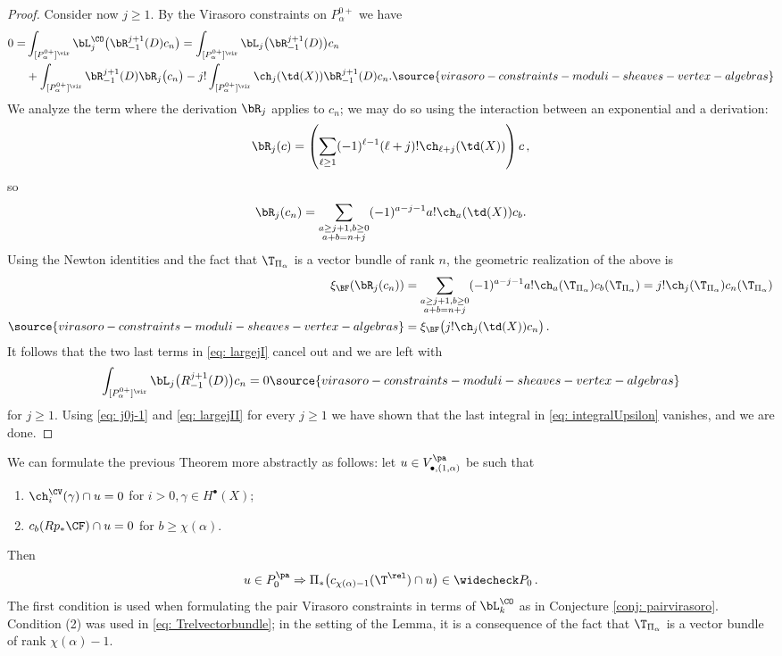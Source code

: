 \begin{proof}
Consider now $j\geq 1$. By the Virasoro constraints on $P^{0+}_\alpha$ we have
\begin{align}\nonumber 0=&\int_{[P_\alpha^{0+}]^\vir}\bL_j^{\CO}\big(\bR_{-1}^{j+1}(D)c_{n}\big)=\int_{[P_\alpha^{0+}]^\vir}\bL_j\big(\bR_{-1}^{j+1}(D)\big)c_{n}\\
&+\int_{[P_\alpha^{0+}]^\vir}\bR_{-1}^{j+1}(D)\bR_j\big(c_{n}\big)-j!\int_{[P_\alpha^{0+}]^\vir} \ch_j(\td(X))\bR_{-1}^{j+1}(D)c_{n}. \label{eq: largejI}
\source{virasoro-constraints-moduli-sheaves-vertex-algebras}
\end{align}
We analyze the term where the derivation $\bR_j$ applies to $c_{n}$; we may do so using the interaction between an exponential and a derivation:
\[\bR_j(c)=\left(\sum_{\ell \geq 1}(-1)^{\ell-1} (\ell+j)! \ch_{\ell+j}(\td(X))\right)c\,,\]
so
\[\bR_j(c_{n})=\sum_{\substack{a\geq j+1, b\geq 0\\
a+b=n+j}} (-1)^{a-j-1} a!\ch_{a}(\td(X))c_{b}.\]
Using the Newton identities and the fact that $\T_{\Pi_\alpha}$ is a vector bundle of rank $n$, the geometric realization of the above is
\begin{align}\nonumber \label{eq: Trelvectorbundle}\xi_\BF(\bR_j(c_{n}))&=\sum_{\substack{a\geq j+1, b\geq 0\\a+b=n+j}} (-1)^{a-j-1} a!\ch_{a}(\T_{\Pi_\alpha})c_{b}(\T_{\Pi_\alpha})=j!\ch_{j}(\T_{\Pi_\alpha})c_{n}(\T_{\Pi_\alpha})\\
\source{virasoro-constraints-moduli-sheaves-vertex-algebras}
&=\xi_\BF\big(j! \ch_j(\td(X))c_n\big)\,.
\end{align}
It follows that the two last terms in \eqref{eq: largejI} cancel out and we are left with
\begin{equation}
\label{eq: largejII} \int_{[P_\alpha^{0+}]^\vir}\bL_j\big(R_{-1}^{j+1}(D)\big)c_{n}=0
\source{virasoro-constraints-moduli-sheaves-vertex-algebras}
\end{equation}
for $j\geq 1$. Using \eqref{eq: j0j-1} and \eqref{eq: largejII} for every $j\geq 1$ we have shown that the last integral in \eqref{eq: integralUpsilon} vanishes, and we are done. \qedhere
\end{proof}

\begin{remark}
\notready\label{rem: abstractprojective}
We can formulate the previous Theorem more abstractly as follows: let $u\in V_{\bullet, (1, \alpha)}^{\pa}$ be such that
\begin{enumerate}
\item $\ch_i^\CV(\gamma)\cap u=0$ for $i>0, \gamma\in H^\bullet(X)$;
\item $c_{b}(Rp_\ast \CF)\cap u=0$ for $b\geq \chi(\alpha)$.
\end{enumerate}
Then
\[u\in P_0^{\pa}\Rightarrow \Pi_\ast\big(c_{\chi(\alpha)-1}(\T^{\rel})\cap u\big)\in \widecheck P_0\,.\]
The first condition is used when formulating the pair Virasoro constraints in terms of $\bL_k^\CO$ as in Conjecture \ref{conj: pairvirasoro}. Condition (2) was used in \eqref{eq: Trelvectorbundle}; in the setting of the Lemma, it is a consequence of the fact that $\T_{\Pi_\alpha}$ is a vector bundle of rank $\chi(\alpha)-1$.
\end{remark}
